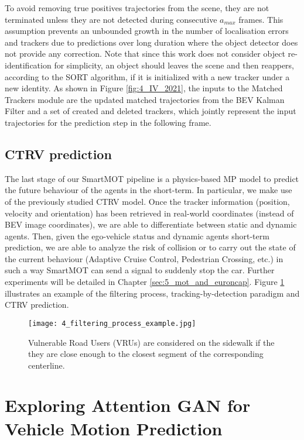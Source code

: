 To avoid removing true positives trajectories from the scene, they are not terminated unless they are not detected during consecutive $a_{max}$ frames. This assumption prevents an unbounded growth in the number of localisation errors and trackers due to predictions over long duration where the object detector does not provide any correction. Note that since this work does not consider object re-identification for simplicity, an object should leaves the scene and then reappers, according to the SORT algorithm, if it is initialized with a new tracker under a new identity. As shown in Figure \ref{fig:4_IV_2021}, the inputs to the Matched Trackers module are the updated matched trajectories from the BEV Kalman Filter and a set of created and deleted trackers, which jointly represent the input trajectories for the prediction step in the following frame.

\subsection{CTRV prediction}
\label{subsec:4_smartmot_ctrv_prediction}

The last stage of our SmartMOT pipeline is a physics-based \ac{MP} model to predict the future behaviour of the agents in the short-term. In particular, we make use of the previously studied \ac{CTRV} model. Once the tracker information (position, velocity and orientation) has been retrieved in real-world coordinates (instead of \ac{BEV} image coordinates), we are able to differentiate between static and dynamic agents. Then, given the ego-vehicle status and dynamic agents short-term prediction, we are able to analyze the risk of collision or to carry out the state of the current behaviour (Adaptive Cruise Control, Pedestrian Crossing, etc.) in such a way SmartMOT can send a signal to suddenly stop the car. Further experiments will be detailed in Chapter \ref{sec:5_mot_and_euroncap}. Figure \ref{fig:4_filtering_process_example} illustrates an example of the filtering process, tracking-by-detection paradigm and \ac{CTRV} prediction.

\begin{figure}[] 
	\centering
	\texttt{[image: 4\_filtering\_process\_example.jpg]}
	\caption{Vulnerable Road Users (VRUs) are considered on the sidewalk if the they are close enough to the closest segment of the corresponding centerline.}
	\label{fig:4_filtering_process_example}
\end{figure} 

\section{Exploring Attention GAN for Vehicle Motion Prediction}
\label{sec:4_gan_lstm}

